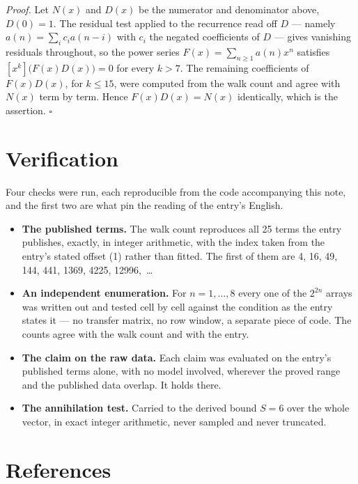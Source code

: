 \documentclass[11pt]{article}
\theoremstyle{definition}
\begin{document}
{\itshape Proof.} Let $N(x)$ and $D(x)$ be the numerator and denominator above, $D(0)=1$. The residual test applied to the recurrence read off $D$ --- namely $a(n) = \sum_i c_i a(n-i)$ with $c_i$ the negated coefficients of $D$ --- gives vanishing residuals throughout, so the power series $F(x)=\sum_{n\ge 1}a(n)x^n$ satisfies $[x^k]\bigl(F(x)D(x)\bigr) = 0$ for every $k > 7$. The remaining coefficients of $F(x)D(x)$, for $k \le 15$, were computed from the walk count and agree with $N(x)$ term by term. Hence $F(x)D(x) = N(x)$ identically, which is the assertion. $\square$

\section{Verification}

Four checks were run, each reproducible from the code accompanying this note, and the first two are what pin the reading of the entry's English.

\begin{itemize}

\item {\bfseries The published terms.} The walk count reproduces all 25 terms the entry publishes, exactly, in integer arithmetic, with the index taken from the entry's stated offset (1) rather than fitted. The first of them are 4, 16, 49, 144, 441, 1369, 4225, 12996,~\dots

\item {\bfseries An independent enumeration.} For $n = 1,\dots,8$ every one of the $2^{2n}$ arrays was written out and tested cell by cell against the condition as the entry states it --- no transfer matrix, no row window, a separate piece of code. The counts agree with the walk count and with the entry.

\item {\bfseries The claim on the raw data.} Each claim was evaluated on the entry's published terms alone, with no model involved, wherever the proved range and the published data overlap. It holds there.

\item {\bfseries The annihilation test.} Carried to the derived bound $S = 6$ over the whole vector, in exact integer arithmetic, never sampled and never truncated.

\end{itemize}

\section{References}
\end{document}
